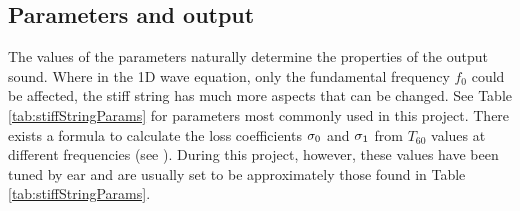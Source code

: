 \subsection{Parameters and output}\label{sec:paramsAndOutput}
The values of the parameters naturally determine the properties of the output sound. Where in the 1D wave equation, only the fundamental frequency $f_0$ could be affected, the stiff string has much more aspects that can be changed. See Table \ref{tab:stiffStringParams} for parameters most commonly used in this project. There exists a formula to calculate the loss coefficients $\sigma_{0}$ and $\sigma_{1}$ from $T_{60}$ values at different frequencies (see \cite[Eq (7.29)]{theBible}). During this project, however, these values have been tuned by ear and are usually set to be approximately those found in Table \ref{tab:stiffStringParams}. 

